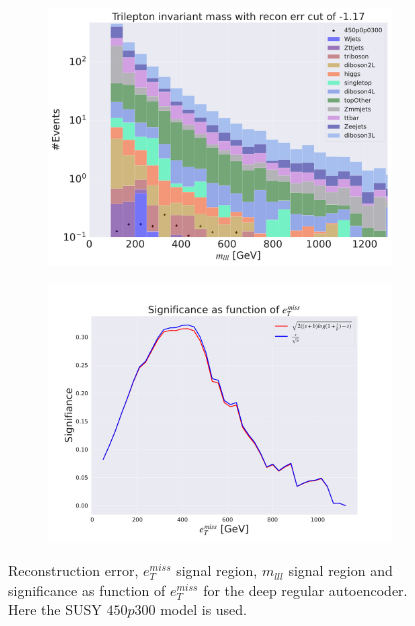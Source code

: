 \begin{figure}[H]
\begin{subfigure}{.40\textwidth}
        \caption{}
        \label{fig:AE_3lep_big_etmiss_450_2}
    \end{subfigure}
    \hfill
    \begin{subfigure}{.40\textwidth}
        \includegraphics[width=\textwidth]{Figures/AE_testing/big/3lep/b_data_recon_big_rm3_feats_sig_450p0p0300_mlll_recon_errcut_-1.17.pdf}
        \caption{}
        \label{fig:AE_3lep_big_mlll_450_2}
    \end{subfigure}
    \hfill   
    \begin{subfigure}{.40\textwidth}
        \includegraphics[width=\textwidth]{Figures/AE_testing/big/3lep/significance_etmiss_450p0p0300_-1.1736206563802147.pdf}
        \caption{}
        \label{fig:AE_3lep_big_signi_450_2}
    \end{subfigure}
    \hfill      
    \caption[3lep deep network | $450p300$ | AE | 2]{Reconstruction error, $e_T^{miss}$ signal region, $m_{lll}$ signal region and significance as function of 
    $e_T^{miss}$ for the deep regular autoencoder. Here the SUSY $450p300$ model is used.}
    \label{fig:AE_3lep_big_rec_sig_signi_450_2}
\end{figure}

